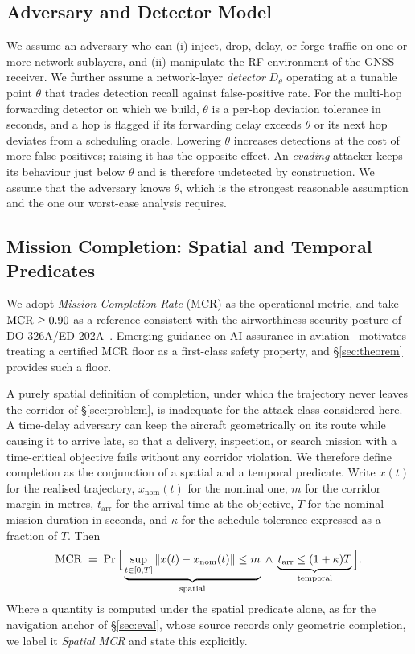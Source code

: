 \subsection{Adversary and Detector Model}
\label{sec:adversary}
We assume an adversary who can (i) inject, drop, delay, or forge traffic on one
or more network sublayers, and (ii) manipulate the RF environment of the GNSS
receiver. We further assume a network-layer \emph{detector} $D_\theta$ operating
at a tunable point $\theta$ that trades detection recall against false-positive
rate. For the multi-hop forwarding detector on which we build, $\theta$ is a
per-hop deviation tolerance in seconds, and a hop is flagged if its forwarding
delay exceeds $\theta$ or its next hop deviates from a scheduling oracle.
Lowering $\theta$ increases detections at the cost of more false positives;
raising it has the opposite effect. An \emph{evading} attacker keeps its
behaviour just below $\theta$ and is therefore undetected by construction. We
assume that the adversary knows $\theta$, which is the strongest reasonable
assumption and the one our worst-case analysis requires.

\subsection{Mission Completion: Spatial and Temporal Predicates}
\label{sec:mcr}
We adopt \emph{Mission Completion Rate} (MCR) as the operational metric, and
take $\mathrm{MCR}\ge0.90$ as a reference consistent with the airworthiness-security
posture of DO-326A/ED-202A~\cite{do326a}. Emerging guidance on AI assurance in
aviation~\cite{ed324} motivates treating a certified MCR floor as a first-class
safety property, and \S\ref{sec:theorem} provides such a floor.

A purely spatial definition of completion, under which the trajectory never
leaves the corridor of \S\ref{sec:problem}, is inadequate for the attack class
considered here. A time-delay adversary can keep the aircraft geometrically on
its route while causing it to arrive late, so that a delivery, inspection, or
search mission with a time-critical objective fails without any corridor
violation. We therefore define completion as the conjunction of a spatial and a
temporal predicate. Write $x(t)$ for the realised trajectory,
$x_{\mathrm{nom}}(t)$ for the nominal one, $m$ for the corridor margin in
metres, $t_{\mathrm{arr}}$ for the arrival time at the objective, $T$ for the
nominal mission duration in seconds, and $\kappa$ for the schedule tolerance
expressed as a fraction of $T$. Then
\begin{equation}
\label{eq:mcr}
\mathrm{MCR} \;=\; \Pr\Big[\underbrace{\sup_{t\in[0,T]}\left\lVert x(t)-x_{\mathrm{nom}}(t)\right\rVert\le m}_{\text{spatial}}
\;\wedge\;
\underbrace{t_{\mathrm{arr}}\le(1+\kappa)T}_{\text{temporal}}\Big].
\end{equation}
Where a quantity is computed under the spatial predicate alone, as for the
navigation anchor of \S\ref{sec:eval}, whose source records only geometric
completion, we label it \emph{Spatial MCR} and state this explicitly.

